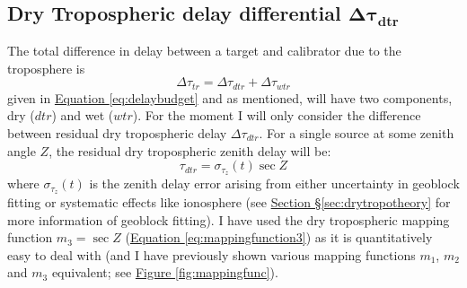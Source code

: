 	\subsection{Dry Tropospheric delay differential $\boldsymbol{\Delta \tau_{dtr}}$}
		The total difference in delay between a target and calibrator due to the troposphere is $$\Delta\tau_{tr}=\Delta\tau_{dtr}+\Delta\tau_{wtr}$$ given in \hyperref[eq:delaybudget]{Equation \ref*{eq:delaybudget}} and as mentioned, will have two components, dry ($dtr$) and wet ($wtr$). For the moment I will only consider the difference between residual dry tropospheric delay $\Delta\tau_{dtr}$.  For a single source at some zenith angle $Z$, the residual dry tropospheric zenith delay will be:
		\begin{equation}
			\tau_{dtr} = \sigma_{\tau_z}(t)\sec Z
		\end{equation} where $\sigma_{\tau_z}(t)$ is the zenith delay error arising from either uncertainty in geoblock fitting or systematic effects like ionosphere (see \hyperref[sec:drytropotheory]{Section \S\ref*{sec:drytropotheory}} for more information of geoblock fitting). I have used the dry tropospheric mapping function $m_3=\sec Z$ (\hyperref[eq:mappingfunction3]{Equation \ref*{eq:mappingfunction3}}) as it is quantitatively easy to deal with (and I have previously shown various mapping functions $m_1$, $m_2$ and $m_3$ equivalent; see \hyperref[fig:mappingfunc]{Figure \ref*{fig:mappingfunc}}). 
		
